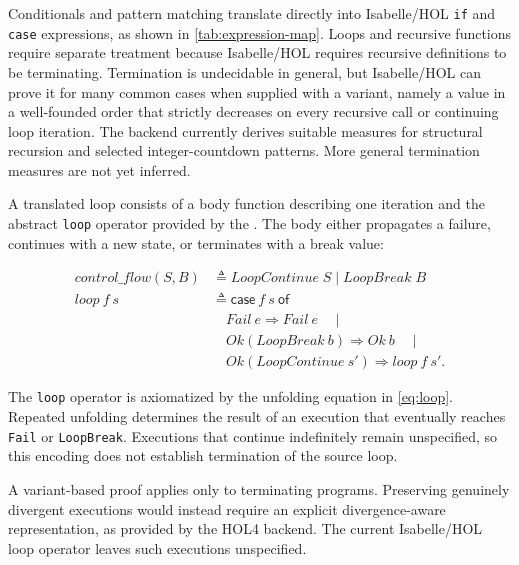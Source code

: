 Conditionals and pattern matching translate directly into Isabelle/HOL \texttt{if} and \texttt{case} expressions, as shown in \autoref{tab:expression-map}.
Loops and recursive functions require separate treatment because Isabelle/HOL requires recursive definitions to be terminating.
Termination is undecidable in general, but Isabelle/HOL can prove it for many common cases when supplied with a variant, namely a value in a well-founded order that strictly decreases on every recursive call or continuing loop iteration.
The backend currently derives suitable measures for structural recursion and selected integer-countdown patterns.
More general termination measures are not yet inferred.

A translated loop consists of a body function describing one iteration and the abstract \texttt{loop} operator provided by the \rprelude{}.
The body either propagates a failure, continues with a new state, or terminates with a break value:

\begin{equation}
\begin{aligned}
 \mathit{control\_flow}(S,B)
   &\triangleq \mathit{LoopContinue}\;S
      \mid \mathit{LoopBreak}\;B\\
 \mathit{loop}\ f\ s
   &\triangleq \mathsf{case}\ f\ s\ \mathsf{of}\\
   &\quad \mathit{Fail}\ e
      \Rightarrow \mathit{Fail}\ e \quad\mid \\
   &\quad \mathit{Ok}(\mathit{LoopBreak}\ b)
      \Rightarrow \mathit{Ok}\ b \quad\mid \\
   &\quad\mathit{Ok}(\mathit{LoopContinue}\ s')
      \Rightarrow \mathit{loop}\ f\ s'.
\end{aligned}
\label{eq:loop}
\end{equation}

The \texttt{loop} operator is axiomatized by the unfolding equation in \autoref{eq:loop}.
Repeated unfolding determines the result of an execution that eventually reaches \texttt{Fail} or \texttt{LoopBreak}.
Executions that continue indefinitely remain unspecified, so this encoding does not establish termination of the source loop.

A variant-based proof applies only to terminating programs.
Preserving genuinely divergent executions would instead require an explicit divergence-aware representation, as provided by the HOL4 backend.
The current Isabelle/HOL loop operator leaves such executions unspecified.

